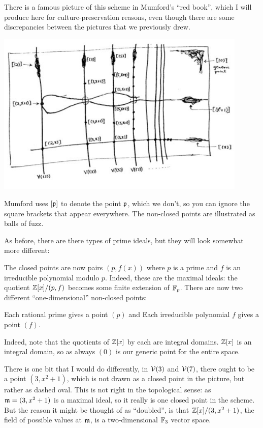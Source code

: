 There is a famous picture of this scheme in Mumford's ``red book'',
which I will produce here for culture-preservation reasons,
even though there are some discrepancies between
the pictures that we previously drew.
\begin{center}
	\includegraphics[width=0.9\textwidth]{media/mumforddrawing.jpg}
\end{center}
Mumford uses $[\mathfrak p]$ to denote the point $\mathfrak p$,
which we don't, so you can ignore the square brackets that appear everywhere.
The non-closed points are illustrated as balls of fuzz.

As before, there are there types of prime ideals,
but they will look somewhat more different:
\begin{itemize}
	\ii The closed points are now pairs $(p, f(x))$
	where $p$ is a prime and $f$ is an irreducible polynomial modulo $p$.
	Indeed, these are the maximal ideals:
	the quotient $\mathbb Z[x] / (p,f)$ becomes some finite extension of $\mathbb F_p$.
	\ii There are now two different ``one-dimensional'' non-closed points:
	\begin{itemize}
		\ii Each rational prime gives a point $(p)$ and
		\ii Each irreducible polynomial $f$ gives a point $(f)$.
	\end{itemize}
	Indeed, note that the quotients of $\mathbb Z[x]$ by each are integral domains.
	\ii $\mathbb Z[x]$ is an integral domain,
	so as always $(0)$ is our generic point for the entire space.
\end{itemize}
There is one bit that I would do differently,
in $\mathcal V(3)$ and $\mathcal V(7)$, there ought to be a point $(3,x^2+1)$,
which is not drawn as a closed point in the picture,
but rather as dashed oval.
This is not right in the topological sense:
as $\mathfrak m = (3, x^2+1)$ is a maximal ideal,
so it really is one closed point in the scheme.
But the reason it might be thought of as ``doubled'',
is that $\mathbb Z[x] / (3,x^2+1)$,
the field of possible values at $\mathfrak m$,
is a two-dimensional $\mathbb F_3$ vector space.

